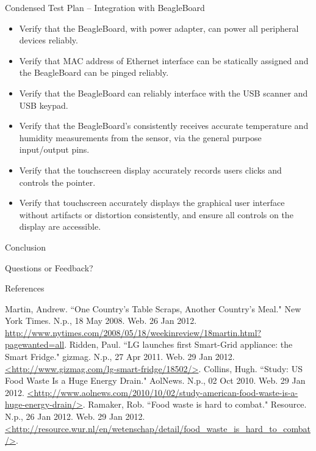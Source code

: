 \documentclass[t]{beamer}
\begin{document}
\begin{frame}{Condensed Test Plan -- Integration with BeagleBoard}
\begin{itemize}
\item Verify that the BeagleBoard, with power adapter, can power all peripheral devices reliably.
\item Verify that MAC address of Ethernet interface can be statically assigned and the BeagleBoard can be pinged reliably.
\item Verify that the BeagleBoard can reliably interface with the USB scanner and USB keypad.
\item Verify that the BeagleBoard's consistently receives accurate temperature and humidity measurements from the sensor, via the general purpose input/output pins.
\item Verify that the touchscreen display accurately records users clicks and controls the pointer.
\item Verify that touchscreen accurately displays the graphical user interface without artifacts or distortion consistently, and ensure all controls on the display are accessible.
\end{itemize}
\end{frame}

\begin{frame}{Conclusion}
\LARGE
\begin{center}
Questions or Feedback?
\end{center}
\end{frame}

\begin{frame}{References}
\footnotesize
\begin{thebibliography}{9}
Martin, Andrew. ``One Country's Table Scraps, Another Country's Meal." New York Times. N.p., 18 May 2008. Web. 26 Jan 2012. 
\url{http://www.nytimes.com/2008/05/18/weekinreview/18martin.html?pagewanted=all}.
Ridden, Paul. ``LG launches first Smart-Grid appliance: the Smart Fridge." gizmag. N.p., 27 Apr 2011. Web. 29 Jan 2012. \url{<http://www.gizmag.com/lg-smart-fridge/18502/>}.
Collins, Hugh. ``Study: US Food Waste Is a Huge Energy Drain." AolNews. N.p., 02 Oct 2010. Web. 29 Jan 2012. \url{<http://www.aolnews.com/2010/10/02/study-american-food-waste-is-a-huge-energy-drain/>}.
Ramaker, Rob. ``Food waste is hard to combat." Resource. N.p., 26 Jan 2012. Web. 29 Jan 2012. \url{<http://resource.wur.nl/en/wetenschap/detail/food_waste_is_hard_to_combat/>}.
 \end{thebibliography}
\end{frame}
\end{document}
